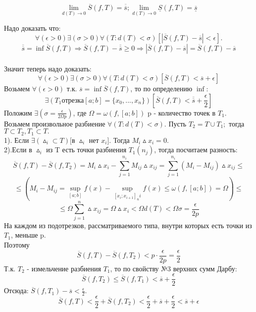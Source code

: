 \begin{teorema}
$$
\lim_{d(T)\to 0}\overline{S}(f,T)=\overline{\overline{s}};
\lim_{d(T)\to 0}\underline{S}(f,T)=\underline{\overline{s}}
$$
\end{teorema}
\dokvo
Надо доказать что:
$$
\forall(\epsilon>0)\exists(\sigma>0)\forall(T:d(T)<\sigma)[|\overline{S}(f,T)-\overline{s}|<\epsilon].
$$
$$
\overline{\overline{s}}=\inf\overline{S}(f,T)\Rightarrow\overline{S}(f,T)-\overline{\overline{s}}\geq 0\Rightarrow|\overline{S}(f,T)-\overline{s}|=\overline{S}(f,T)-
\overline{s}
$$
\\
Значит теперь надо доказать:
$$
\forall(\epsilon>0)\exists(\sigma>0)\forall(T:d(T)<\sigma)[\overline{S}(f,T)<\overline{s}+\epsilon]
$$
Возьмем $\forall(\epsilon>0)$ т.к. $\overline{s}=\inf \overline{S}(f,T)$, то по определению $\inf:$
$$\exists(T_1 отрезка [a;b]=\{x_0,...,x_n\})[\overline{S}(f,T)<\overline{\overline{s}}+\frac{\epsilon}{2}]$$
Положим $\exists(\sigma=\frac{\epsilon}{2\Omega p})$, где $\Omega=\omega(f,[a;b])$ p - количество точек в $T_1.$
\\
Возьмем произвольное разбиение $\forall(T:d(T)<\sigma).$
Пусть $T_2=T \cup T_1;$ тогда $T \subset T_2, T_1 \subset T.$
\\
1). Если $\exists(\vartriangle_i \subset T)[$в $\vartriangle_i$ нет $x_i].$ Тогда $M_i \vartriangle x_i = 0.$
\\
2).Если в $\vartriangle_i$ из T есть точки разбиения $T_1(n_j)$, тогда посчитаем разность:
$$
\overline{S}(f,T)-\overline{S}(f,T_2)=M_i\vartriangle x_i - \sum_{j=1}^{n_i}M_{ij}\vartriangle x_{ij} = \sum_{j=1}^{n_i}(M_i - M_{ij})\vartriangle x_{ij} \leq 
$$
$$
\leq (M_i - M_{ij}=\sup_{[a;b]}f(x)-\sup_{[x_i;x_{i+1}]_ni}f(x) \leq\omega(f,[a;b])=\Omega) \leq
$$
$$
\leq\Omega\sum_{j=1}^{n}\vartriangle x_{ij} =\Omega\vartriangle x_i<\Omega d(T)<\Omega\sigma=\frac{\epsilon}{2p}
$$
На каждом из подотрезков, рассматриваемого типа, внутри которых есть точки из $T_1$, меньше p.
\\
Поэтому
$$
\overline{S}(f,T)-\overline{S}(f,T_2)<p\cdot\frac{\epsilon}{2p}=\frac{\epsilon}{2}
$$
Т.к. $T_2$ - измельчение разбиения $T_1$, то по свойству №3 верхних сумм Дарбу:
$$
\overline{S}(f,T_2)\leq\overline{S}(f,T_1)<\overline{s}+\frac{\epsilon}{2}
$$
Отсюда: $\overline{S}(f,T_1)-\overline{s}<\frac{\epsilon}{2}.$
$$\overline{S}(f,T)<\frac{\epsilon}{2}+\overline{S}(f,T_2)<\frac{\epsilon}{2}+\overline{s}+\frac{\epsilon}{2}<\overline{s}+\epsilon$$
\dokno



